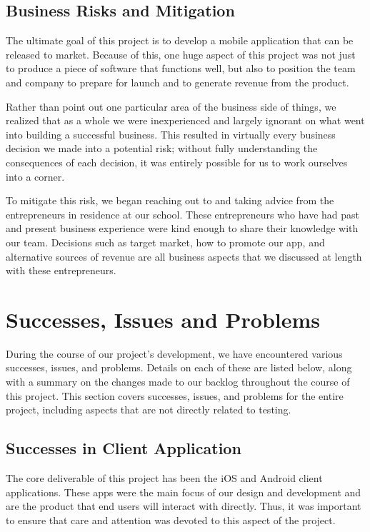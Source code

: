\subsection{Business Risks and Mitigation}

The ultimate goal of this project is to develop a mobile application that can be
released to market. Because of this, one huge aspect of this project was not
just to produce a piece of software that functions well, but also to position
the team and company to prepare for launch and to generate revenue from the
product.

Rather than point out one particular area of the business side of things, we
realized that as a whole we were inexperienced and largely ignorant on what went
into building a successful business. This resulted in virtually every business
decision we made into a potential risk; without fully understanding the
consequences of each decision, it was entirely possible for us to work ourselves
into a corner.

To mitigate this risk, we began reaching out to and taking advice from the
entrepreneurs in residence at our school. These entrepreneurs who have had
past and present business experience were kind enough to share their knowledge
with our team. Decisions such as target market, how to promote our app, and
alternative sources of revenue are all business aspects that we discussed at
length with these entrepreneurs.



\section{Successes, Issues and Problems}

During the course of our project's development, we have encountered various
successes, issues, and problems. Details on each of these are listed below,
along with a summary on the changes made to our backlog throughout the course of
this project. This section covers successes, issues, and problems for the entire
project, including aspects that are not directly related to testing.


\subsection{Successes in Client Application}

The core deliverable of this project has been the iOS and Android client
applications. These apps were the main focus of our design and development and
are the product that end users will interact with directly. Thus, it was
important to ensure that care and attention was devoted to this aspect of the
project.

